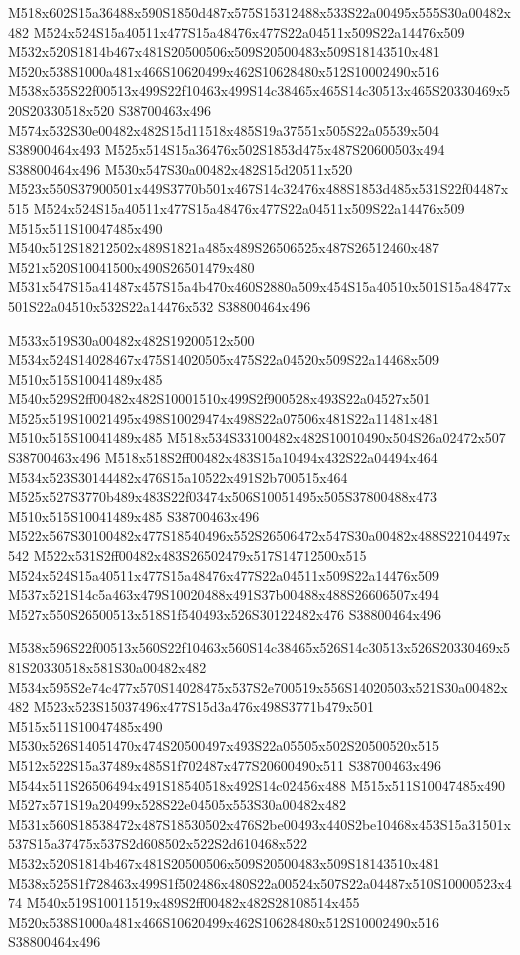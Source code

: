\documentclass{article}
\begin{document}
\begin{multicols}{2}
M518x602S15a36488x590S1850d487x575S15312488x533S22a00495x555S30a00482x482 M524x524S15a40511x477S15a48476x477S22a04511x509S22a14476x509 M532x520S1814b467x481S20500506x509S20500483x509S18143510x481 M520x538S1000a481x466S10620499x462S10628480x512S10002490x516 M538x535S22f00513x499S22f10463x499S14c38465x465S14c30513x465S20330469x520S20330518x520 S38700463x496 M574x532S30e00482x482S15d11518x485S19a37551x505S22a05539x504 S38900464x493 M525x514S15a36476x502S1853d475x487S20600503x494 S38800464x496 M530x547S30a00482x482S15d20511x520 M523x550S37900501x449S3770b501x467S14c32476x488S1853d485x531S22f04487x515 M524x524S15a40511x477S15a48476x477S22a04511x509S22a14476x509 M515x511S10047485x490 M540x512S18212502x489S1821a485x489S26506525x487S26512460x487 M521x520S10041500x490S26501479x480 M531x547S15a41487x457S15a4b470x460S2880a509x454S15a40510x501S15a48477x501S22a04510x532S22a14476x532 S38800464x496

M533x519S30a00482x482S19200512x500 M534x524S14028467x475S14020505x475S22a04520x509S22a14468x509 M510x515S10041489x485 M540x529S2ff00482x482S10001510x499S2f900528x493S22a04527x501 M525x519S10021495x498S10029474x498S22a07506x481S22a11481x481 M510x515S10041489x485 M518x534S33100482x482S10010490x504S26a02472x507 S38700463x496 M518x518S2ff00482x483S15a10494x432S22a04494x464 M534x523S30144482x476S15a10522x491S2b700515x464 M525x527S3770b489x483S22f03474x506S10051495x505S37800488x473 M510x515S10041489x485 S38700463x496 M522x567S30100482x477S18540496x552S26506472x547S30a00482x488S22104497x542 M522x531S2ff00482x483S26502479x517S14712500x515 M524x524S15a40511x477S15a48476x477S22a04511x509S22a14476x509 M537x521S14c5a463x479S10020488x491S37b00488x488S26606507x494 M527x550S26500513x518S1f540493x526S30122482x476 S38800464x496

M538x596S22f00513x560S22f10463x560S14c38465x526S14c30513x526S20330469x581S20330518x581S30a00482x482 M534x595S2e74c477x570S14028475x537S2e700519x556S14020503x521S30a00482x482 M523x523S15037496x477S15d3a476x498S3771b479x501 M515x511S10047485x490 M530x526S14051470x474S20500497x493S22a05505x502S20500520x515 M512x522S15a37489x485S1f702487x477S20600490x511 S38700463x496 M544x511S26506494x491S18540518x492S14c02456x488 M515x511S10047485x490 M527x571S19a20499x528S22e04505x553S30a00482x482 M531x560S18538472x487S18530502x476S2be00493x440S2be10468x453S15a31501x537S15a37475x537S2d608502x522S2d610468x522 M532x520S1814b467x481S20500506x509S20500483x509S18143510x481 M538x525S1f728463x499S1f502486x480S22a00524x507S22a04487x510S10000523x474 M540x519S10011519x489S2ff00482x482S28108514x455 M520x538S1000a481x466S10620499x462S10628480x512S10002490x516 S38800464x496


\end{multicols}
\end{document}
